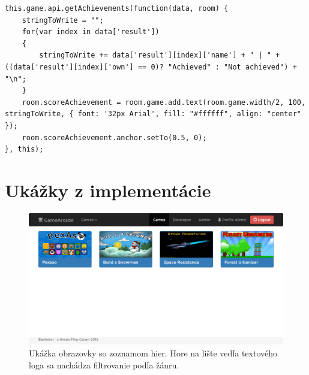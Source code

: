 \begin{lstlisting}[]
this.game.api.getAchievements(function(data, room) {
    stringToWrite = "";
    for(var index in data['result'])
    {
        stringToWrite += data['result'][index]['name'] + " | " + ((data['result'][index]['own'] == 0)? "Achieved" : "Not achieved") + "\n";
    }
    room.scoreAchievement = room.game.add.text(room.game.width/2, 100, stringToWrite, { font: '32px Arial', fill: "#ffffff", align: "center" });
    room.scoreAchievement.anchor.setTo(0.5, 0);
}, this);
\end{lstlisting}


\chapter{Ukážky z implementácie}
\label{pr:implementacia}
\begin{figure}[h]
  \centering
  \includegraphics[scale=0.35]{fig/ukazka-zoznam-hier.png}
  \caption{Ukážka obrazovky so zoznamom hier. Hore na lište vedľa textového loga sa nachádza filtrovanie podľa žánru.}
  \label{fig:ukazka-zoznamhier}
\end{figure}

